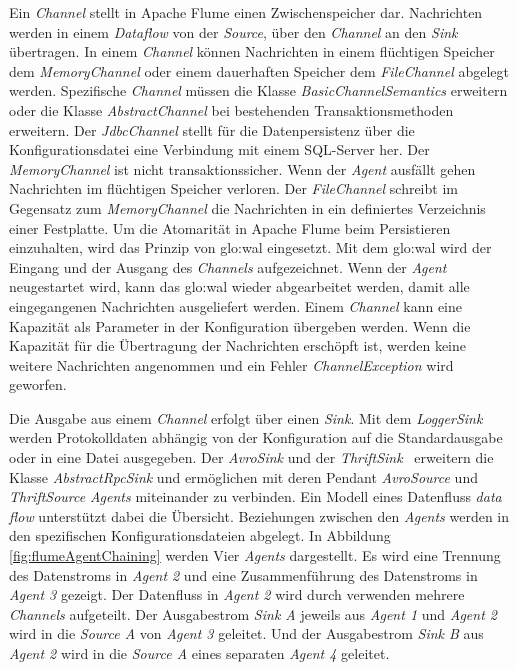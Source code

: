 Ein \textit{Channel} stellt in Apache Flume einen Zwischenspeicher dar. Nachrichten werden in einem \textit{Dataflow} von der \textit{Source}, über den \textit{Channel} an den \textit{Sink} übertragen. In einem \textit{Channel} können Nachrichten in einem flüchtigen Speicher dem \textit{MemoryChannel} oder einem dauerhaften Speicher dem \textit{FileChannel} abgelegt werden. Spezifische \textit{Channel} müssen die Klasse \textit{BasicChannelSemantics}  erweitern oder die Klasse \textit{AbstractChannel} bei bestehenden Transaktionsmethoden erweitern. Der \textit{JdbcChannel} stellt für die Datenpersistenz über die Konfigurationsdatei eine Verbindung mit einem SQL-Server her. Der \textit{MemoryChannel} ist nicht transaktionssicher. Wenn der \textit{Agent} ausfällt gehen Nachrichten im flüchtigen Speicher verloren. Der \textit{FileChannel} schreibt im Gegensatz zum \textit{MemoryChannel} die Nachrichten in ein definiertes Verzeichnis einer Festplatte. Um die Atomarität in Apache Flume beim Persistieren einzuhalten, wird das Prinzip von \gls{glo:wal} eingesetzt. Mit dem \gls{glo:wal} wird der Eingang und der Ausgang des \textit{Channels} aufgezeichnet. Wenn der \textit{Agent} neugestartet wird, kann das \gls{glo:wal} wieder abgearbeitet werden, damit alle eingegangenen Nachrichten ausgeliefert werden. Einem \textit{Channel} kann eine Kapazität als Parameter in der Konfiguration übergeben werden. Wenn die Kapazität für die Übertragung der Nachrichten erschöpft ist, werden keine weitere Nachrichten angenommen und ein Fehler \textit{ChannelException} wird geworfen. 

Die Ausgabe aus einem \textit{Channel} erfolgt über einen \textit{Sink}. Mit dem \textit{LoggerSink} werden Protokolldaten abhängig von der Konfiguration auf die Standardausgabe oder in eine Datei ausgegeben. Der \textit{AvroSink}  und der \textit{ThriftSink}~ erweitern die Klasse \textit{AbstractRpcSink}  und ermöglichen mit deren Pendant \textit{AvroSource} und \textit{ThriftSource} \textit{Agents} miteinander zu verbinden. Ein Modell eines Datenfluss \textit{data flow} unterstützt dabei die Übersicht. Beziehungen zwischen den \textit{Agents} werden in den spezifischen Konfigurationsdateien abgelegt. In Abbildung \ref{fig:flumeAgentChaining} werden Vier \textit{Agents} dargestellt. Es wird eine Trennung des Datenstroms in \textit{Agent 2} und eine Zusammenführung des Datenstroms in \textit{Agent 3} gezeigt. Der Datenfluss in \textit{Agent 2} wird durch verwenden mehrere \textit{Channels} aufgeteilt. Der Ausgabestrom \textit{Sink A} jeweils aus \textit{Agent 1} und \textit{Agent 2} wird in die \textit{Source A} von \textit{Agent 3} geleitet. Und der Ausgabestrom \textit{Sink B} aus \textit{Agent 2} wird in die \textit{Source A} eines separaten \textit{Agent 4} geleitet.

